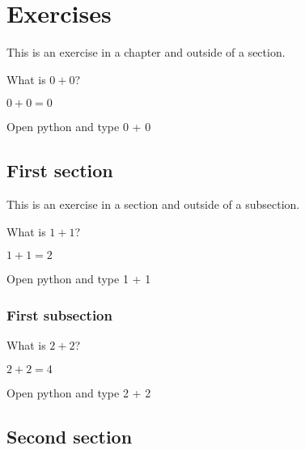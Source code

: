 \documentclass[oneside]{book}
\begin{document}
\chapter{Exercises}

\begin{exercise}
This is an exercise in a chapter and outside of a section.

What is \(0 + 0\)?
\end{exercise}

\begin{solution}
  \(0 + 0 = 0\)
\end{solution}

\begin{additionalinformation}
Open python and type 0 + 0
\end{additionalinformation}

\section{First section}

\begin{exercise}
This is an exercise in a section and outside of a subsection.

What is \(1 + 1\)?
\end{exercise}

\begin{solution}
  \(1 + 1 = 2\)
\end{solution}

\begin{additionalinformation}
Open python and type 1 + 1
\end{additionalinformation}

\subsection{First subsection}

\begin{exercise}[subtitle={Simple Addition}]
  What is \(2 + 2\)?
\end{exercise}

\begin{solution}
  \(2 + 2 = 4\)
\end{solution}

\begin{additionalinformation}
Open python and type 2 + 2
\end{additionalinformation}

\section{Second section}
\end{document}
